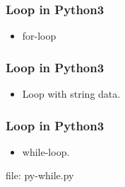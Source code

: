 \begin{frame}[fragile]
\frametitle{Loop in Python3}
\begin{itemize}
\item for-loop 

\end{itemize}
\end{frame}

\begin{frame}[fragile]
\frametitle{Loop in Python3}
\begin{itemize}
\item Loop with string data.

\end{itemize}
\end{frame}

\begin{frame}[fragile]
\frametitle{Loop in Python3}
\newcommand{\newfilename}{py-while.py}

\begin{itemize}
\item while-loop.

\end{itemize}
file: \newfilename
\end{frame}